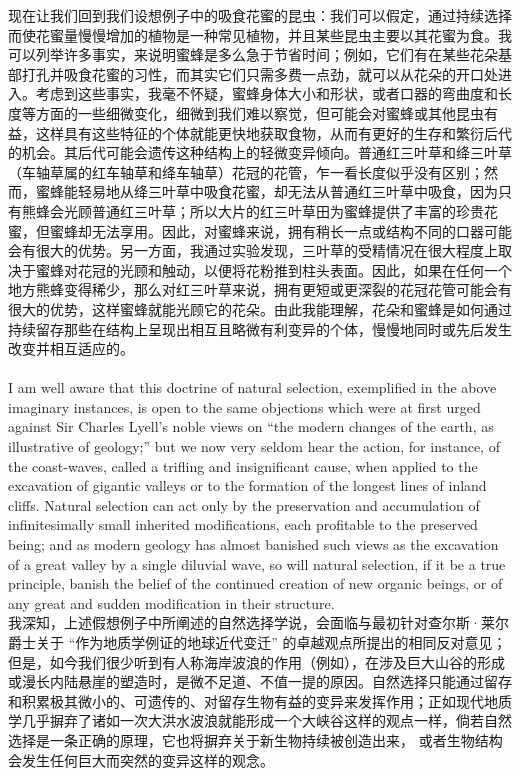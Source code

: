 \documentclass{article}
\begin{document}
现在让我们回到我们设想例子中的吸食花蜜的昆虫：我们可以假定，通过持续选择而使花蜜量慢慢增加的植物是一种常见植物，并且某些昆虫主要以其花蜜为食。我可以列举许多事实，来说明蜜蜂是多么急于节省时间；例如，它们有在某些花朵基部打孔并吸食花蜜的习性，而其实它们只需多费一点劲，就可以从花朵的开口处进入。考虑到这些事实，我毫不怀疑，蜜蜂身体大小和形状，或者口器的弯曲度和长度等方面的一些细微变化，细微到我们难以察觉，但可能会对蜜蜂或其他昆虫有益，这样具有这些特征的个体就能更快地获取食物，从而有更好的生存和繁衍后代的机会。其后代可能会遗传这种结构上的轻微变异倾向。普通红三叶草和绛三叶草（车轴草属的红车轴草和绛车轴草）花冠的花管，乍一看长度似乎没有区别；然而，蜜蜂能轻易地从绛三叶草中吸食花蜜，却无法从普通红三叶草中吸食，因为只有熊蜂会光顾普通红三叶草；所以大片的红三叶草田为蜜蜂提供了丰富的珍贵花蜜，但蜜蜂却无法享用。因此，对蜜蜂来说，拥有稍长一点或结构不同的口器可能会有很大的优势。另一方面，我通过实验发现，三叶草的受精情况在很大程度上取决于蜜蜂对花冠的光顾和触动，以便将花粉推到柱头表面。因此，如果在任何一个地方熊蜂变得稀少，那么对红三叶草来说，拥有更短或更深裂的花冠花管可能会有很大的优势，这样蜜蜂就能光顾它的花朵。由此我能理解，花朵和蜜蜂是如何通过持续留存那些在结构上呈现出相互且略微有利变异的个体，慢慢地同时或先后发生改变并相互适应的。\\

\\
I am well aware that this doctrine of natural selection, exemplified in the above imaginary instances, is open to the same objections which were at first urged against Sir Charles Lyell’s noble views on “the modern changes of the earth, as illustrative of geology;” but we now very seldom hear the action, for instance, of the coast-waves, called a trifling and insignificant cause, when applied to the excavation of gigantic valleys or to the formation of the longest lines of inland cliffs. Natural selection can act only by the preservation and accumulation of infinitesimally small inherited modifications, each profitable to the preserved being; and as modern geology has almost banished such views as the excavation of a great valley by a single diluvial wave, so will natural selection, if it be a true principle, banish the belief of the continued creation of new organic beings, or of any great and sudden modification in their structure.\\
我深知，上述假想例子中所阐述的自然选择学说，会面临与最初针对查尔斯·莱尔爵士关于 “作为地质学例证的地球近代变迁” 的卓越观点所提出的相同反对意见；但是，如今我们很少听到有人称海岸波浪的作用（例如），在涉及巨大山谷的形成或漫长内陆悬崖的塑造时，是微不足道、不值一提的原因。自然选择只能通过留存和积累极其微小的、可遗传的、对留存生物有益的变异来发挥作用；正如现代地质学几乎摒弃了诸如一次大洪水波浪就能形成一个大峡谷这样的观点一样，倘若自然选择是一条正确的原理，它也将摒弃关于新生物持续被创造出来， 或者生物结构会发生任何巨大而突然的变异这样的观念。 \\
\end{document}
